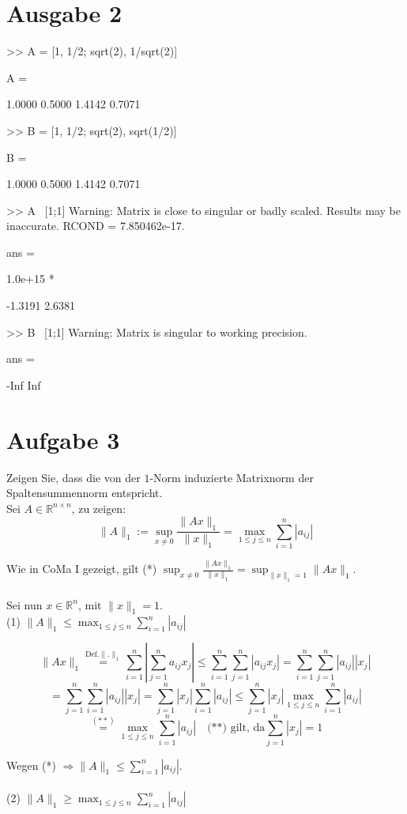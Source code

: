 \documentclass[11pt,a4paper,ngerman]{article}
\begin{document}

\section*{Ausgabe 2}
>> A = [1, 1/2; sqrt(2), 1/sqrt(2)]

A =

    1.0000    0.5000
    1.4142    0.7071

>> B = [1, 1/2; sqrt(2), sqrt(1/2)]

B =

    1.0000    0.5000
    1.4142    0.7071

>> A \ [1;1]
Warning: Matrix is close to singular or badly scaled.
         Results may be inaccurate. RCOND = 7.850462e-17. 

ans =

   1.0e+15 *

   -1.3191
    2.6381

>> B \ [1;1]
Warning: Matrix is singular to working precision. 

ans =

  -Inf
   Inf



\section*{Aufgabe 3}
Zeigen Sie, dass die von der $1$-Norm induzierte Matrixnorm der Spaltensummennorm entspricht. \\

Sei $A \in \mathbb{R}^{n \times n}$, zu zeigen:
$$ \|A \|_1 := \sup_{x \neq 0}{\frac{\|Ax\|_{1}}{\|x\|_{1}}}
                  =\max_{1 \leq j \leq n}{\sum_{i=1}^{n}{|a_{ij}|}} $$

Wie in CoMa I gezeigt, gilt
(*) $\sup_{x \neq 0}{\frac{\|Ax\|_{1}}{\|x\|_{1}}} = \sup_{\|x\|_{1} = 1}{\|Ax\|_{1}}$. \\ \\
Sei nun $x \in \mathbb{R}^{n}$, mit $\|x\|_{1} = 1$.\\

(1) $\|A \|_1 \leq \max_{1 \leq j \leq n}{\sum_{i=1}^{n}{|a_{ij}|}}$ 

$$
\|Ax\|_{1} \stackrel{\text{Def.}\|.\|_{1}}{=}
     \sum_{i=1}^{n}{\left| \sum_{j=1}^{n}{a_{ij}x_j} \right|}
\leq \sum_{i=1}^{n}{\sum_{j=1}^{n}{\left|a_{ij}x_j\right|} }
=    \sum_{i=1}^{n}{\sum_{j=1}^{n}{|a_{ij}||x_j|} }
$$
$$
=    \sum_{j=1}^{n}{\sum_{i=1}^{n}{|a_{ij}||x_j|} }
=    \sum_{j=1}^{n}{|x_j| \sum_{i=1}^{n}{|a_{ij}|} }
\leq \sum_{j=1}^{n}{|x_j| \max_{1\leq j \leq n}{\sum_{i=1}^{n}{|a_{ij}|}} }
$$
$$
\stackrel{(**)}{=} \max_{1\leq j \leq n}{\sum_{i=1}^{n}{|a_{ij}|}} \quad \text{(**) gilt, da} \sum_{j=1}^{n}{|x_j|} = 1
$$

Wegen (*) $\Rightarrow \|A\|_{1} \leq \sum_{i=1}^{n}{|a_{ij}|}$. \\ \\

(2) $\|A \|_1 \geq \max_{1 \leq j \leq n}{\sum_{i=1}^{n}{|a_{ij}|}}$ 

\label{LastPage}
\end{document}
